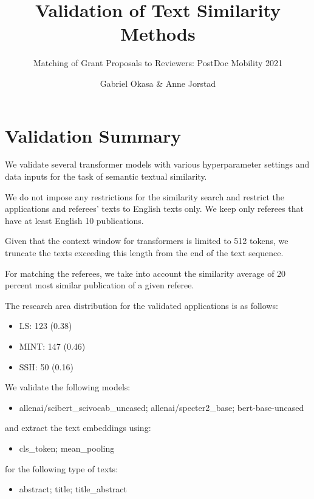 \documentclass[
]{article}
\title{Validation of Text Similarity Methods}
\subtitle{Matching of Grant Proposals to Reviewers: PostDoc Mobility
2021}
\author{Gabriel Okasa \& Anne Jorstad}
\date{}
\providecommand{\tightlist}{%
  \setlength{\itemsep}{0pt}\setlength{\parskip}{0pt}}
\begin{document}
\maketitle

\hypertarget{validation-summary}{%
\section{Validation Summary}\label{validation-summary}}

We validate several transformer models with various hyperparameter
settings and data inputs for the task of semantic textual similarity.

We do not impose any restrictions for the similarity search and restrict
the applications and referees' texts to English texts only. We keep only
referees that have at least English 10 publications.

Given that the context window for transformers is limited to 512 tokens,
we truncate the texts exceeding this length from the end of the text
sequence.

For matching the referees, we take into account the similarity average
of 20 percent most similar publication of a given referee.

The research area distribution for the validated applications is as
follows:

\begin{itemize}
\tightlist
\item
  LS: 123 (0.38)
\item
  MINT: 147 (0.46)
\item
  SSH: 50 (0.16)
\end{itemize}

We validate the following models:

\begin{itemize}
\tightlist
\item
  allenai/scibert\_scivocab\_uncased; allenai/specter2\_base;
  bert-base-uncased
\end{itemize}

and extract the text embeddings using:

\begin{itemize}
\tightlist
\item
  cls\_token; mean\_pooling
\end{itemize}

for the following type of texts:

\begin{itemize}
\tightlist
\item
  abstract; title; title\_abstract
\end{itemize}
\end{document}
